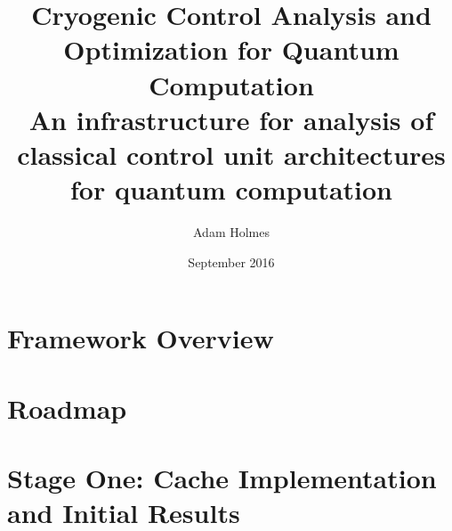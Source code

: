 \documentclass[12pt]{report}
\begin{document}
\title{
    {Cryogenic Control Analysis and Optimization for Quantum Computation}\\
    {\small An infrastructure for analysis of classical control unit architectures for quantum computation}\\
}


\author{Adam Holmes}

\date{September 2016}



\maketitle

\chapter*{Framework Overview}


\chapter*{Roadmap}


\chapter*{Stage One: Cache Implementation and Initial Results}


%
%
%




\end{document}

